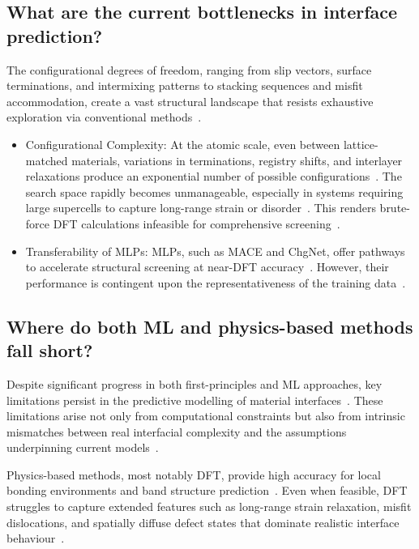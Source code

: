\subsection*{What are the current bottlenecks in interface prediction?}

The configurational degrees of freedom, ranging from slip vectors, surface terminations, and intermixing patterns to stacking sequences and misfit accommodation, create a vast structural landscape that resists exhaustive exploration via conventional methods~\cite{Schutt2019-sz, Leung2020-tv, Di_Liberto2022-gz}.
\begin{itemize}
    \item Configurational Complexity: At the atomic scale, even between lattice-matched materials, variations in terminations, registry shifts, and interlayer relaxations produce an exponential number of possible configurations~\nocite{}.
    The search space rapidly becomes unmanageable, especially in systems requiring large supercells to capture long-range strain or disorder~\nocite{}.
    This renders brute-force DFT calculations infeasible for comprehensive screening~\cite{Butler2019-ws, Gerber2023-yd}.
    \item Transferability of MLPs: MLPs, such as MACE and ChgNet, offer pathways to accelerate structural screening at near-DFT accuracy~\cite{Batatia2022-xz, Deng2023-tg}.
    However, their performance is contingent upon the representativeness of the training data~\nocite{}.
\end{itemize}

\newpage \subsection*{Where do both ML and physics-based methods fall short?}

Despite significant progress in both first-principles and ML approaches, key limitations persist in the predictive modelling of material interfaces~\nocite{}.
These limitations arise not only from computational constraints but also from intrinsic mismatches between real interfacial complexity and the assumptions underpinning current models~\cite{Gerber2023-yd, Uhrin2025-ba}.

Physics-based methods, most notably DFT, provide high accuracy for local bonding environments and band structure prediction~\nocite{}.
Even when feasible, DFT struggles to capture extended features such as long-range strain relaxation, misfit dislocations, and spatially diffuse defect states that dominate realistic interface behaviour~\cite{Batzner2022-fd, Gerber2023-yd}.

